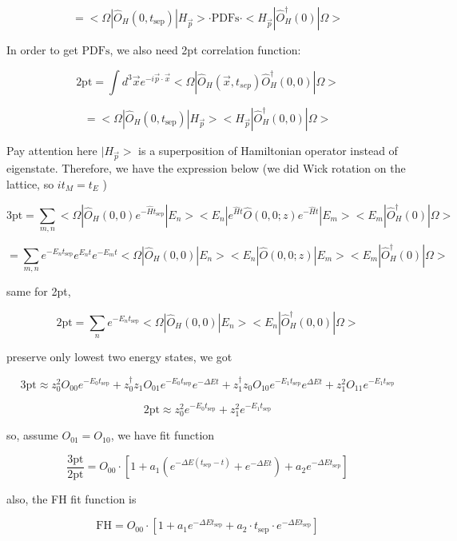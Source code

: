 \documentclass[11pt]{article} %
\begin{document}
\[ = <\Omega |\hat{O}_{H} (0, t_{\text{sep}})  |H_{\vec{p}}> \cdot \text{PDFs} \cdot <H_{\vec{p}}| \hat{O}_{H}^{\dagger}(0) | \Omega> \]

In order to get $\text{PDFs}$, we also need 2pt correlation function:

\[ \text{2pt} = \int d^{3} \vec{x} e^{-i \vec{p} \cdot \vec{x}} <\Omega |\hat{O}_{H}\left(\vec{x}, t_{s e p}\right) \hat{O}_{H}^{\dagger}(0,0) | \Omega> \]

\[ = <\Omega |\hat{O}_{H} (0, t_{\text{sep}})  |H_{\vec{p}}>  <H_{\vec{p}}| \hat{O}_{H}^{\dagger}(0, 0) | \Omega> \]

{\color{red} Pay attention here $|H_{\vec{p}}>$ is a superposition of Hamiltonian operator instead of eigenstate. Therefore, we have the expression below (we did Wick rotation on the lattice, so $it_{M} = t_{E}$ ) }

\[ \text{3pt} = \sum_{m, n} <\Omega |\hat{O}_{H} (0, 0) e^{- \hat{H} t_{\text{sep}}}  |E_n><E_n| e^{\hat{H} t } \hat{O}(0, 0; z) e^{- \hat{H} t} |E_m><E_m| \hat{O}_{H}^{\dagger}(0) | \Omega>  \]

\[ = \sum_{m, n} e^{- E_n t_{\text{sep}}} e^{E_n t } e^{- E_m t} <\Omega |\hat{O}_{H} (0, 0)  |E_n><E_n|  \hat{O}(0, 0; z) |E_m><E_m| \hat{O}_{H}^{\dagger}(0) | \Omega> \]


same for 2pt,

\[ \text{2pt} =  \sum_{n} e^{- E_n t_{\text{sep}}} <\Omega |\hat{O}_{H} (0, 0)  |E_n>  <E_n| \hat{O}_{H}^{\dagger}(0, 0) | \Omega>  \]

preserve only lowest two energy states, we got

\[ \text{3pt} \approx z_0^2 O_{00} e^{-E_0 t_{\text{sep}}} + z_0^{\dagger} z_1 O_{01} e^{-E_0 t_{\text{sep}}} e^{- \Delta E t} + z_1^{\dagger} z_0 O_{10} e^{-E_1 t_{\text{sep}}} e^{\Delta E t} + z_1^2 O_{11} e^{- E_1 t_{\text{sep}}} \]

\[ \text{2pt} \approx z_0^2 e^{-E_0 t_{\text{sep}}} + z_1^2 e^{-E_1 t_{\text{sep}}} \]

so, assume $O_{01} = O_{10}$, we have fit function

\[ \frac{\text{3pt}}{\text{2pt}} = O_{00} \cdot [1 + a_1 (e^{- \Delta E (t_{\text{sep}} - t)} + e^{- \Delta E t}) + a_2 e^{- \Delta E t_{\text{sep}}}]  \]

also, the FH fit function is

\[ \text{FH} = O_{00} \cdot [1 + a_1 e^{- \Delta E t_{\text{sep}}} + a_2 \cdot t_{\text{sep}} \cdot e^{- \Delta E t_{\text{sep}}} ]  \]
\end{document}
